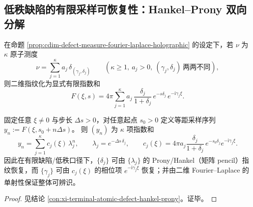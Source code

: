 \subsection{低秩缺陷的有限采样可恢复性：Hankel--Prony 双向分解}\label{subsec:cdim-hankel-prony-reconstruction}
在命题 \ref{prop:cdim-defect-measure-fourier-laplace-holographic} 的设定下，若 \(\nu\) 为 \(\kappa\) 原子测度
\[
\nu=\sum_{j=1}^{\kappa}a_j\,\delta_{(\gamma_j,\delta_j)}
\qquad(\kappa\ge 1,\ a_j>0,\ (\gamma_j,\delta_j)\ \text{两两不同}),
\]
则二维指纹化为显式有限指数和
\[
F(\xi,s)=4\pi\sum_{j=1}^{\kappa}a_j\,\frac{\delta_j}{1+\delta_j}\,e^{-s\delta_j}\,e^{-\mathrm{i}\gamma_j\xi}.
\]

\begin{proposition}[有限采样的低秩可逆性与参数分离]\label{prop:cdim-atomic-defect-hankel-prony}
固定任意 \(\xi\neq 0\) 与步长 \(\Delta s>0\)，对任意起点 \(s_0>0\) 定义等距采样序列
\(
y_n:=F(\xi,s_0+n\Delta s)
\)。
则 \((y_n)\) 为 \(\kappa\) 项指数和
\[
y_n=\sum_{j=1}^{\kappa}c_j(\xi)\,\lambda_j^{n},
\qquad
\lambda_j=e^{-\Delta s\,\delta_j},
\qquad
c_j(\xi)=4\pi a_j\frac{\delta_j}{1+\delta_j}\,e^{-s_0\delta_j}e^{-\mathrm{i}\gamma_j\xi}.
\]
因此在有限缺陷/低秩口径下，\(\{\delta_j\}\) 可由 \(\{\lambda_j\}\) 的 Prony/Hankel（矩阵 pencil）指纹恢复，而 \(\{\gamma_j\}\) 可由 \(c_j(\xi)\) 的相位项 \(e^{-\mathrm{i}\gamma_j\xi}\) 恢复；并由二维 Fourier--Laplace 的单射性保证整体可辨识。
\end{proposition}
\begin{proof}
见结论 \ref{con:xi-terminal-atomic-defect-hankel-prony}。证毕。
\end{proof}

